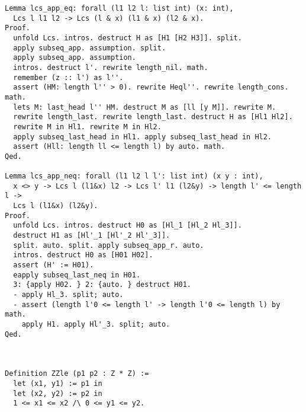 \begin{verbatim}
Lemma lcs_app_eq: forall (l1 l2 l: list int) (x: int),
  Lcs l l1 l2 -> Lcs (l & x) (l1 & x) (l2 & x). 
Proof.
  unfold Lcs. intros. destruct H as [H1 [H2 H3]]. split. 
  apply subseq_app. assumption. split. 
  apply subseq_app. assumption. 
  intros. destruct l'. rewrite length_nil. math. 
  remember (z :: l') as l''. 
  assert (HM: length l'' > 0). rewrite Heql''. rewrite length_cons. math. 
  lets M: last_head l'' HM. destruct M as [ll [y M]]. rewrite M. 
  rewrite length_last. rewrite length_last. destruct H as [Hl1 Hl2]. 
  rewrite M in Hl1. rewrite M in Hl2. 
  apply subseq_last_head in Hl1. apply subseq_last_head in Hl2. 
  assert (Hll: length ll <= length l) by auto. math. 
Qed. 

Lemma lcs_app_neq: forall (l1 l2 l l': list int) (x y : int),
  x <> y -> Lcs l (l1&x) l2 -> Lcs l' l1 (l2&y) -> length l' <= length l ->
  Lcs l (l1&x) (l2&y). 
Proof.
  unfold Lcs. intros. destruct H0 as [Hl_1 [Hl_2 Hl_3]]. 
  destruct H1 as [Hl'_1 [Hl'_2 Hl'_3]]. 
  split. auto. split. apply subseq_app_r. auto. 
  intros. destruct H0 as [H01 H02]. 
  assert (H' := H01). 
  eapply subseq_last_neq in H01. 
  3: {apply H02. } 2: {auto. } destruct H01. 
  - apply Hl_3. split; auto. 
  - assert (length l'0 <= length l' -> length l'0 <= length l) by math. 
    apply H1. apply Hl'_3. split; auto. 
Qed.



Definition ZZle (p1 p2 : Z * Z) :=
  let (x1, y1) := p1 in
  let (x2, y2) := p2 in
  1 <= x1 <= x2 /\ 0 <= y1 <= y2.


\end{verbatim}
